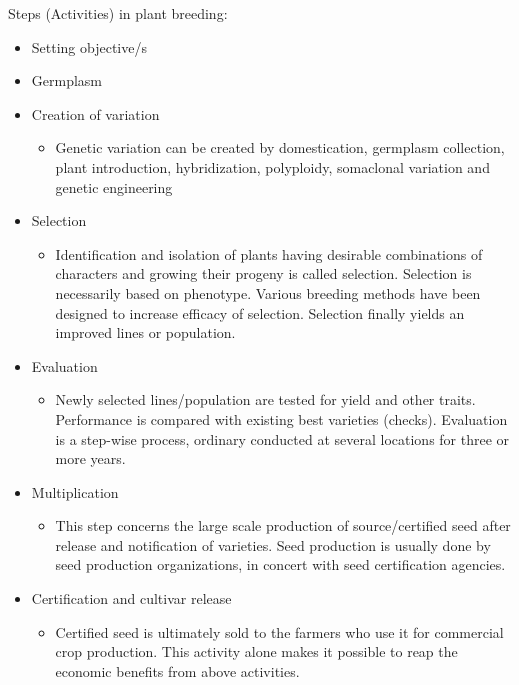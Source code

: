 \documentclass[11pt,ignorenonframetext,aspectratio=169]{beamer}
\providecommand{\tightlist}{%
  \setlength{\itemsep}{0pt}\setlength{\parskip}{0pt}}
\begin{document}
\begin{frame}{Steps (Activities) in plant breeding:}
\small

\begin{itemize}
\tightlist
\item
  Setting objective/s
\item
  Germplasm
\item
  Creation of variation

  \begin{itemize}
  \footnotesize
  \item Genetic variation can be created by domestication, germplasm collection, plant introduction, hybridization, polyploidy, somaclonal variation and genetic engineering
  \end{itemize}
\item
  Selection

  \begin{itemize}
  \footnotesize
  \item Identification and isolation of plants having desirable combinations of characters and growing their progeny is called selection. Selection is necessarily based on phenotype. Various breeding methods have been designed to increase efficacy of selection. Selection finally yields an improved lines or population.
  \end{itemize}
\item
  Evaluation

  \begin{itemize}
  \footnotesize
  \item Newly selected lines/population are tested for yield and other traits. Performance is compared with existing best varieties (checks). Evaluation is a step-wise process, ordinary conducted at several locations for three or more years.
  \end{itemize}
\item
  Multiplication

  \begin{itemize}
  \footnotesize
  \item This step concerns the large scale production of source/certified seed after release and notification of varieties. Seed production is usually done by seed production organizations, in concert with seed certification agencies.
  \end{itemize}
\item
  Certification and cultivar release

  \begin{itemize}
  \footnotesize
  \item Certified seed is ultimately sold to the farmers who use it for commercial crop production. This activity alone makes it possible to reap the economic benefits from above activities.
  \end{itemize}
\end{itemize}
\end{frame}
\end{document}
